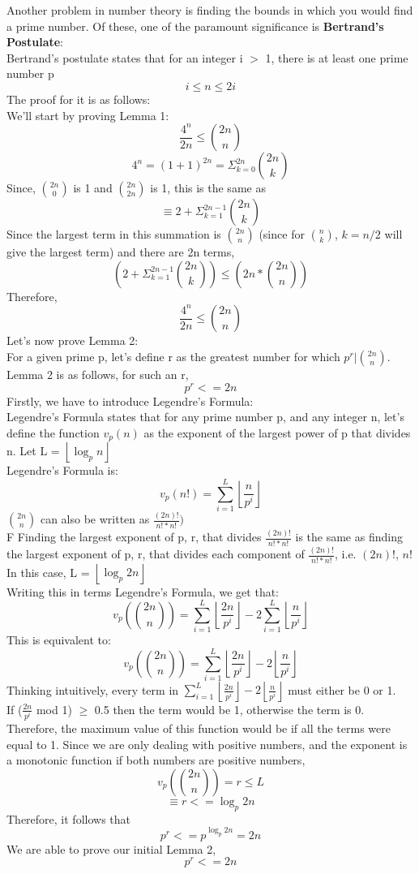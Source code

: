 \documentclass[12pt, letterpaper]{article}
\begin{document}
Another problem in number theory is finding the bounds in which you would find a prime number. Of these, one of the paramount significance is \textbf{Bertrand's Postulate}: \\
Bertrand's postulate states that for an integer i $>$ 1, there is at least one prime number p
\[
    i \leq n \leq 2i 
\]
The proof for it is as follows:\\
We'll start by proving Lemma 1:\\
\[
    \frac{4^n}{2n} \leq {2n \choose n}
\]
\[
    4^n = (1 + 1)^{2n} = \Sigma_{k = 0}^{2n} {2n \choose k} 
\]
Since, $2n \choose 0$ is 1 and $2n \choose 2n$ is 1, this is the same as
\[
    \equiv 2 + \Sigma_{k = 1}^{2n - 1} {2n \choose k} 
\]
Since the largest term in this summation is $2n \choose n$ (since for $n \choose k$, $k = n/2$ will give the largest term) and there are 2n terms, 
\[
     (2 + \Sigma_{k = 1}^{2n - 1} {2n \choose k}) \leq (2n * {2n \choose n})
\]
Therefore, 
\[
    \frac{4^n}{2n} \leq {2n \choose n}
\]
Let's now prove Lemma 2:\\
For a given prime p, let's define r as the greatest number for which $p^r | {2n \choose n}$. Lemma 2 is as follows, for such an r, 
\[
    p^r <= 2n
\]
Firstly, we have to introduce Legendre's Formula:\\
Legendre's Formula states that for any prime number p, and any integer n, let's define the function $v_p(n)$ as the exponent of the largest power of p that divides n. Let L = $\left\lfloor \log_{p}{n} \right\rfloor$\\
Legendre's Formula is:
\[
    v_{p}(n!) = \sum_{i = 1}^{L} {\left\lfloor \frac{n}{p^i} \right\rfloor}
\]
${2n \choose n}$ can also be written as $\frac{(2n)!}{n!*n!})$\\F
Finding the largest exponent of p, r, that divides $\frac{(2n)!}{n!*n!}$ is the same as finding the largest exponent of p, r, that divides each component of $\frac{(2n)!}{n!*n!}$, i.e. $(2n)!$, $n!$\\

In this case, L = $\left\lfloor \log_{p}{2n} \right\rfloor$\\ Writing this in terms Legendre's Formula, we get that:
\[
    v_{p}({2n \choose n}) = \sum_{i = 1}^{L} {\left\lfloor \frac{2n}{p^i} \right\rfloor} - 2\sum_{i = 1}^{L} {\left\lfloor \frac{n}{p^i} \right\rfloor}
\]
This is equivalent to:
\[
    v_{p}({2n \choose n}) = \sum_{i = 1}^{L} {\left\lfloor \frac{2n}{p^i} \right\rfloor - 2\left\lfloor \frac{n}{p^i} \right\rfloor}
\]
Thinking intuitively, every term in $\sum_{i = 1}^{L} {\left\lfloor \frac{2n}{p^i} \right\rfloor - 2\left\lfloor \frac{n}{p^i} \right\rfloor}$ must either be 0 or 1.\\
If ($\frac{2n}{p^i}$ mod 1) $\geq$ 0.5 then the term would be 1, otherwise the term is 0. Therefore, the maximum value of this function would be if all the terms were equal to 1. Since we are only dealing with positive numbers, and the exponent is a monotonic function if both numbers are positive numbers,
\[
    v_{p}({2n \choose n}) = r \leq L
\]
\[
    \equiv r <= \log_{p}{2n}
\]
Therefore, it follows that
\[
    p^r <= p^{\log_{p}{2n}} = 2n
\]
We are able to prove our initial Lemma 2, 
\[
    p^r <= 2n
\]
\end{document}
